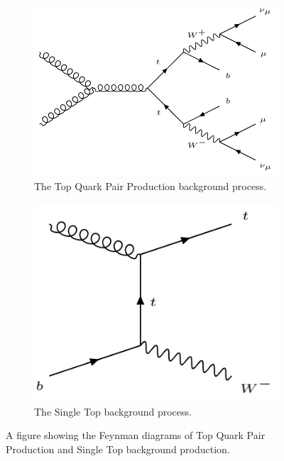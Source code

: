 \documentclass[12pt,a4paper,epsf,portrait,times,epsfig]{report}
\begin{document}
		\begin{figure} [h!]
			\begin{subfigure}{.49\textwidth}
				\centering
				\includegraphics[scale=0.3]{Gluon_ttbar}
				\caption{The Top Quark Pair Production \newline background process.}
				\label{Fig:SFigTtbarFeynman}
			\end{subfigure}
			\begin{subfigure}{.49\textwidth}
				\centering
				\includegraphics[scale=0.4]{Single_Quark}
				\caption{The Single Top background process.}
				\label{Fig:SFigWtFeynman}
			\end{subfigure}
			\caption{A figure showing the Feynman diagrams of Top Quark Pair Production and Single Top background production.}
			\label{Fig:FeynmanBackground1}
		\end{figure}
		
\end{document}
